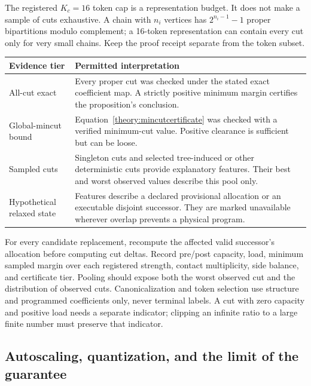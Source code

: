 \documentclass[11pt,a4paper]{article}
\theoremstyle{definition}\newtheorem{definition}[proposition]{Definition}
\begin{document}
The registered $K_c=16$ token cap is a representation budget. It does not make a sample of cuts exhaustive. A chain with $n_i$ vertices has $2^{n_i-1}-1$ proper bipartitions modulo complement; a 16-token representation can contain every cut only for very small chains. Keep the proof receipt separate from the token subset.

{\small
\begin{longtable}{@{}p{}p{}@{}}
\toprule
Evidence tier & Permitted interpretation \\
\midrule
\endhead
All-cut exact & Every proper cut was checked under the stated exact coefficient map. A strictly positive minimum margin certifies the proposition's conclusion. \\
Global-mincut bound & Equation~\eqref{theory:mincutcertificate} was checked with a verified minimum-cut value. Positive clearance is sufficient but can be loose. \\
Sampled cuts & Singleton cuts and selected tree-induced or other deterministic cuts provide explanatory features. Their best and worst observed values describe this pool only. \\
Hypothetical relaxed state & Features describe a declared provisional allocation or an executable disjoint successor. They are marked unavailable wherever overlap prevents a physical program. \\
\bottomrule
\end{longtable}}

For every candidate replacement, recompute the affected valid successor's allocation before computing cut deltas. Record pre/post capacity, load, minimum sampled margin over each registered strength, contact multiplicity, side balance, and certificate tier. Pooling should expose both the worst observed cut and the distribution of observed cuts. Canonicalization and token selection use structure and programmed coefficients only, never terminal labels. A cut with zero capacity and positive load needs a separate indicator; clipping an infinite ratio to a large finite number must preserve that indicator.

\subsection{Autoscaling, quantization, and the limit of the guarantee}
\label{theory:limits}
\end{document}
